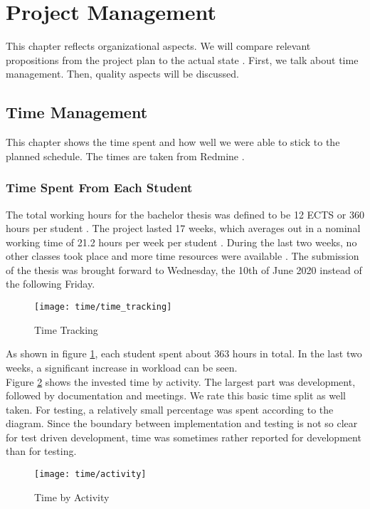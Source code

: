 \section{Project Management}
\label{section:project_management}
This chapter reflects organizational aspects.
We will compare relevant propositions from the project plan to the actual state \cite{projectplan}.
First, we talk about time management. Then, quality aspects will be discussed.

\subsection{Time Management}
This chapter shows the time spent and how well we were able to stick to the planned schedule.
The times are taken from Redmine \cite{redmine}.

\subsubsection{Time Spent From Each Student}
The total working hours for the bachelor thesis was defined to be 12 ECTS or 360 hours per student \cite{projectplan}.
The project lasted 17 weeks, which averages out in a nominal working time of 21.2 hours per week per student \cite{projectplan}.
During the last two weeks, no other classes took place and more time resources were available \cite{projectplan}.
The submission of the thesis was brought forward to Wednesday, the 10th of June 2020 instead of the following Friday.

\begin{figure}[H]
    \centering
    \texttt{[image: time/time\_tracking]}
    \caption{Time Tracking}
    \label{fig:timetracking}
\end{figure}

As shown in figure \ref{fig:timetracking}, each student spent about 363 hours in total.
In the last two weeks, a significant increase in workload can be seen. \\

Figure \ref{fig:timetracking_activity} shows the invested time by activity.
The largest part was development, followed by documentation and meetings.
We rate this basic time split as well taken.
For testing, a relatively small percentage was spent according to the diagram.
Since the boundary between implementation and testing is not so clear for test driven development,
time was sometimes rather reported for development than for testing.

\begin{figure}[H]
    \centering
    \texttt{[image: time/activity]}
    \caption{Time by Activity}
    \label{fig:timetracking_activity}
\end{figure}

